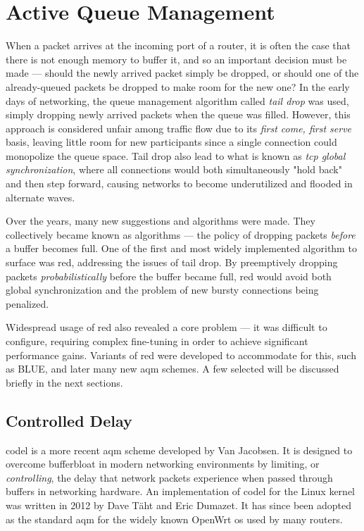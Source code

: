 \section{Active Queue Management}

When a packet arrives at the incoming port of a router, it is often the case that there is not enough memory to buffer it, and so an important decision must be made --- should the newly arrived packet simply be dropped, or should one of the already-queued packets be dropped to make room for the new one? In the early days of networking, the queue management algorithm called \textit{tail drop} was used, simply dropping newly arrived packets when the queue was filled. However, this approach is considered unfair among traffic flow due to its \textit{first come, first serve} basis, leaving little room for new participants since a single connection could monopolize the queue space. \cite{on_traffic_phase_effects_in_packet_switched_gateways} Tail drop also lead to what is known as \textit{\gls{tcp} global synchronization}, where all connections would both simultaneously "hold back" and then step forward, causing networks to become underutilized and flooded in alternate waves.

Over the years, many new suggestions and algorithms were made. They collectively became known as  algorithms --- the policy of dropping packets \textit{before} a buffer becomes full. One of the first and most widely implemented algorithm to surface was \gls{red}, addressing the issues of tail drop. By preemptively dropping packets \textit{probabilistically} before the buffer became full, \gls{red} would avoid both global synchronization and the problem of new bursty connections being penalized. \cite{ieee251892}

Widespread usage of \gls{red} also revealed a core problem --- it was difficult to configure, requiring complex fine-tuning in order to achieve significant performance gains. Variants of \gls{red} were developed to accommodate for this, such as BLUE, and later many new \gls{aqm} schemes. A few selected will be discussed briefly in the next sections.



\subsection{Controlled Delay}

\gls{codel} is a more recent \gls{aqm} scheme developed by Van Jacobsen. It is designed to overcome bufferbloat in modern networking environments by limiting, or \textit{controlling}, the delay that network packets experience when passed through buffers in networking hardware. An implementation of \gls{codel} for the Linux kernel was written in 2012 by Dave Täht and Eric Dumazet. It has since been adopted as the standard \gls{aqm} for the widely known OpenWrt \gls{os} used by many routers.

